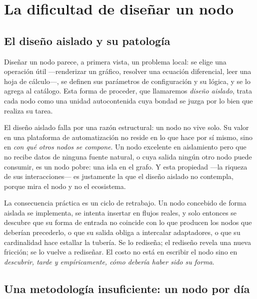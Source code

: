 \documentclass[11pt,a4paper]{article}
\theoremstyle{definition}
\theoremstyle{plain}
\begin{document}
\vspace{0.5cm}
\tableofcontents
\newpage

\section{La dificultad de diseñar un nodo}

\subsection{El diseño aislado y su patología}

Diseñar un nodo parece, a primera vista, un problema local: se elige una operación
útil ---renderizar un gráfico, resolver una ecuación diferencial, leer una hoja de
cálculo---, se definen sus parámetros de configuración y su lógica, y se lo agrega
al catálogo. Esta forma de proceder, que llamaremos \emph{diseño aislado}, trata
cada nodo como una unidad autocontenida cuya bondad se juzga por lo bien que
realiza su tarea.

El diseño aislado falla por una razón estructural: un nodo no vive solo. Su valor
en una plataforma de automatización no reside en lo que hace por sí mismo, sino en
\emph{con qué otros nodos se compone}. Un nodo excelente en aislamiento pero que no
recibe datos de ninguna fuente natural, o cuya salida ningún otro nodo puede
consumir, es un nodo pobre: una isla en el grafo. Y esta propiedad ---la riqueza de
sus interacciones--- es justamente la que el diseño aislado no contempla, porque
mira el nodo y no el ecosistema.

La consecuencia práctica es un ciclo de retrabajo. Un nodo concebido de forma
aislada se implementa, se intenta insertar en flujos reales, y solo entonces se
descubre que su forma de entrada no coincide con lo que producen los nodos que
deberían precederlo, o que su salida obliga a intercalar adaptadores, o que su
cardinalidad hace estallar la tubería. Se lo rediseña; el rediseño revela una nueva
fricción; se lo vuelve a rediseñar. El costo no está en escribir el nodo sino en
\emph{descubrir, tarde y empíricamente, cómo debería haber sido su forma}.

\subsection{Una metodología insuficiente: un nodo por día}
\end{document}
